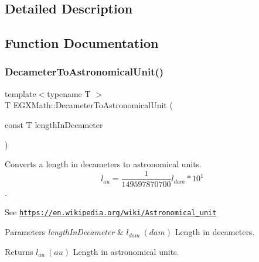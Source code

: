 \subsection{Detailed Description}


\subsection{Function Documentation}
\mbox{\label{group___e_g_x_math-_conversions-_length_conversions-_s_i-_decameter-_astronomical_ga04365d1ba4f6dc4e7a607d720ccd807b}} 
\subsubsection{\texorpdfstring{Decameter\+To\+Astronomical\+Unit()}{DecameterToAstronomicalUnit()}}
{\footnotesize\ttfamily template$<$typename T $>$ \\
T E\+G\+X\+Math\+::\+Decameter\+To\+Astronomical\+Unit (\begin{DoxyParamCaption}\item[{const T}]{length\+In\+Decameter }\end{DoxyParamCaption})}



Converts a length in decameters to astronomical units. \[ l_{au}= \frac{1}{149597870700} l_{dam} * 10^{1} \]. 

See \href{https://en.wikipedia.org/wiki/Astronomical_unit}{\tt https\+://en.\+wikipedia.\+org/wiki/\+Astronomical\+\_\+unit} 
\begin{DoxyParams}{Parameters}
{\em length\+In\+Decameter} & $ l_{dam}\ (dam)$ Length in decameters. \\
\hline
\end{DoxyParams}
\begin{DoxyReturn}{Returns}
$ l_{au}\ (au)$ Length in astronomical units. 
\end{DoxyReturn}
\mbox{\label{group___e_g_x_math-_conversions-_length_conversions-_s_i-_decameter-_astronomical_gaf31492b0cfcc0ec057856854376a2ba6}} 
